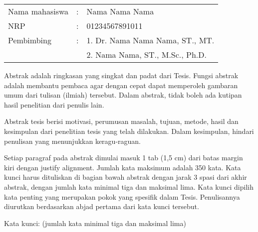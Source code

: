 
\begin{tabular}{lcl}
Nama mahasiswa &:& Nama Nama Nama\\
NRP &:& 01234567891011\\
Pembimbing &:& 1. Dr. Nama Nama Nama, ST., MT.\\
& & 2. Nama Nama, ST., M.Sc., Ph.D.\\
\end{tabular}

\vspace{1ex}


Abstrak adalah ringkasan yang singkat dan padat dari Tesis. Fungsi abstrak adalah membantu pembaca agar dengan cepat dapat memperoleh gambaran umum dari tulisan (ilmiah) tersebut. Dalam abstrak, tidak boleh ada kutipan hasil penelitian dari penulis lain.

Abstrak tesis berisi motivasi, perumusan masalah, tujuan, metode, hasil dan kesimpulan dari penelitian tesis yang telah dilakukan. Dalam kesimpulan, hindari penulisan yang menunjukkan keragu-raguan.

Setiap paragraf pada abstrak dimulai masuk 1 tab (1,5 cm) dari batas margin kiri dengan justify alignment. Jumlah kata maksimum adalah 350 kata. Kata kunci harus dituliskan di bagian bawah abstrak dengan jarak 3 spasi dari akhir abstrak, dengan jumlah kata minimal tiga dan maksimal lima. Kata kunci dipilih kata penting yang merupakan pokok yang spesifik dalam Tesis. Penulisannya diurutkan berdasarkan abjad pertama dari kata kunci tersebut.

\vspace{6ex}

\noindent Kata kunci: (jumlah kata minimal tiga dan maksimal lima)